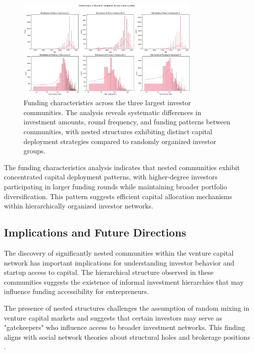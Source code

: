 \documentclass[12pt]{article}
\begin{document}
\begin{figure}[htbp]
\centering
\includegraphics[width=0.8\textwidth]{./assets/funding-characteristics.png}
\caption{Funding characteristics across the three largest investor communities. The analysis reveals systematic differences in investment amounts, round frequency, and funding patterns between communities, with nested structures exhibiting distinct capital deployment strategies compared to randomly organized investor groups.}
\label{fig:funding_characteristics}
\end{figure}

The funding characteristics analysis indicates that nested communities exhibit concentrated capital deployment patterns, with higher-degree investors participating in larger funding rounds while maintaining broader portfolio diversification. This pattern suggests efficient capital allocation mechanisms within hierarchically organized investor networks.



\subsection{Implications and Future Directions}

The discovery of significantly nested communities within the venture capital network has important implications for understanding investor behavior and startup access to capital. The hierarchical structure observed in these communities suggests the existence of informal investment hierarchies that may influence funding accessibility for entrepreneurs.

The presence of nested structures challenges the assumption of random mixing in venture capital markets and suggests that certain investors may serve as "gatekeepers" who influence access to broader investment networks. This finding aligns with social network theories about structural holes and brokerage positions \cite{Borgatti2011}.
\end{document}
